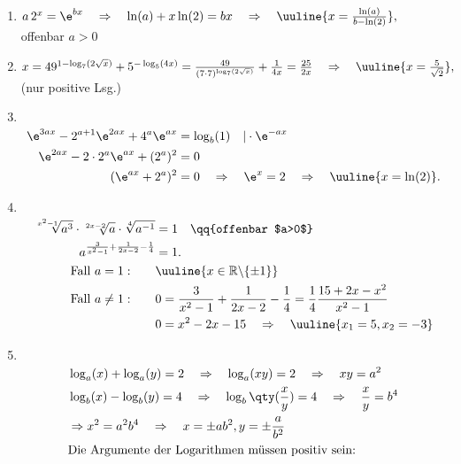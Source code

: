 \begin{enumerate}[label=(\alph*)]
    \setlength{\mathindent}{0cm}
    \item $a\,2^x=\e^{bx} \quad \Rightarrow \quad \ln(a)+x\ln(2) = bx \quad \Rightarrow \quad \uuline{x = \frac{\ln(a)}{b-\ln(2)}},\quad$ offenbar $a>0$
    \item $x=49^{1-\log_7(2\sqrt{x})}+5^{-\log_5(4x)} = \frac{49}{(7\cdot 7)^{\log_7(2\sqrt{x})}} + \frac{1}{4x} = \frac{25}{2x} \quad \Rightarrow \quad \uuline{x = \frac{5}{\sqrt{2}}},\quad$ (nur positive Lsg.)
    \item$~$\\[-1.4cm]
    \begin{align}
        \e^{3ax}-2^{a+1}\e^{2ax}+4^a\e^{ax} &=\log_b(1) \quad |\cdot \e^{-ax} \\
        \e^{2ax} - 2\cdot 2^a \e^{ax} + (2^a)^2 &= 0 \\
        (\e^{ax}+2^a)^2 &= 0  \quad \Rightarrow \quad \e^x = 2 \quad \Rightarrow \quad \uuline{x = \ln(2)}.
    \end{align}
    \item$~$\\[-1.4cm]
    \begin{align}
        \sqrt[x^2-1]{a^3}\cdot\sqrt[2x-2]{a}\cdot\sqrt[4]{a^{-1}} &=1 \quad \qq{offenbar $a>0$} \\
        a^{\frac{3}{x^2-1} + \frac{1}{2x-2} - \frac{1}{4}} &= 1. \\
        \text{Fall } a=1: \qquad & \uuline{x \in \mathbb{R}\backslash \{\pm 1\}} \\
        \text{Fall } a\neq 1: \qquad & 0=\frac{3}{x^2-1} + \frac{1}{2x-2} - \frac{1}{4} = \frac{1}{4} \frac{15+ 2x-x^2}{x^2-1} \\
        &0 = x^2 -2x-15 \quad \Rightarrow \quad \uuline{x_1 =5, x_2 = -3}
    \end{align}
    \item$~$\\[-1.4cm]
    \begin{align}
        &\log_a(x) + \log_a(y) = 2 \quad\Rightarrow\quad \log_a(xy) = 2 \quad\Rightarrow\quad xy = a^2 \\
        &\log_b(x) - \log_b(y) =4 \quad\Rightarrow\quad \log_b\qty(\frac{x}{y}) = 4 \quad \Rightarrow \quad \frac{x}{y} = b^4\\
        &\Rightarrow x^2 = a^2 b^4 \quad \Rightarrow \quad x = \pm ab^2, y = \pm \frac{a}{b^2}\\
        &\text{Die Argumente der Logarithmen müssen positiv sein:}\\

\end{align}
\end{enumerate}
